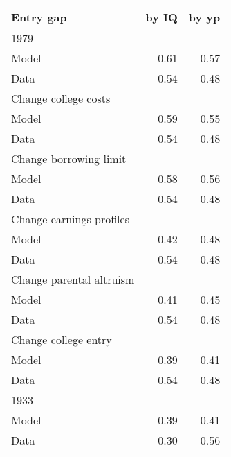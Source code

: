 \begin{tabular}{lrr}
\hline
Entry gap & by IQ  & by yp  \\ 
\hline
1979 &   &   \\ 
Model & 0.61  & 0.57  \\ 
Data & 0.54  & 0.48  \\ 
Change college costs &   &   \\ 
Model & 0.59  & 0.55  \\ 
Data & 0.54  & 0.48  \\ 
Change borrowing limit &   &   \\ 
Model & 0.58  & 0.56  \\ 
Data & 0.54  & 0.48  \\ 
Change earnings profiles &   &   \\ 
Model & 0.42  & 0.48  \\ 
Data & 0.54  & 0.48  \\ 
Change parental altruism &   &   \\ 
Model & 0.41  & 0.45  \\ 
Data & 0.54  & 0.48  \\ 
Change college entry &   &   \\ 
Model & 0.39  & 0.41  \\ 
Data & 0.54  & 0.48  \\ 
1933 &   &   \\ 
Model & 0.39  & 0.41  \\ 
Data & 0.30  & 0.56  \\ 
\hline
\end{tabular}%
